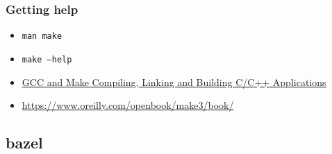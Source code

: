 \subsubsection{Getting help}%
\label{ssub:getting_help}
\begin{itemize}
  \item \texttt{man make}
  \item \texttt{make --help}
  \item \href{https://www3.ntu.edu.sg/home/ehchua/programming/cpp/gcc_make.html} { GCC and Make Compiling, Linking and Building C/C++ Applications }
    \item \href{Managing Projects with GNU Make, Third Edition}{https://www.oreilly.com/openbook/make3/book/} 
\end{itemize}



\subsection{bazel} 


